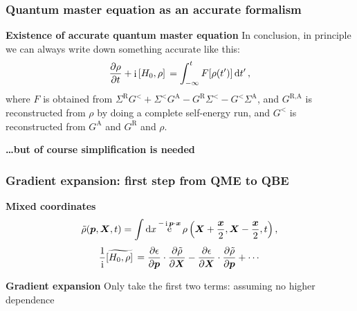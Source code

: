 \documentclass[t]{beamer}
\DeclareMathOperator{\ee}{e}
\DeclareMathOperator{\ii}{i}
\begin{document}
\begin{frame}
\frametitle{Quantum master equation as an accurate formalism}

\textbf{Existence of accurate quantum master equation} 
In conclusion, in principle we can always write down something accurate like this:
\begin{equation}
    \pdv{\rho}{t} + \ii \comm*{H_0}{\rho} = \int_{-\infty}^{t} F[\rho(t')] \dd{t'},
\end{equation}
where $F$ is obtained from $\Sigma^{\text{R}} G^< + \Sigma^< G^{\text{A}} - G^{\text{R}} \Sigma^< - G^< \Sigma^{\text{A}}$,
and $G^{\text{R}, \text{A}}$ is reconstructed from $\rho$ 
by doing a complete self-energy run,
and $G^<$ is reconstructed from $G^\text{A}$ and $G^{\text{R}}$ and $\rho$.

\vspace{0.25pt}

\textbf{\dots but of course simplification is needed} 

\end{frame}

\begin{frame}
\frametitle{Gradient expansion: first step from QME to QBE}

\textbf{Mixed coordinates}
\begin{equation}
    \tilde{\rho}(\vb*{p}, \vb*{X}, t) = \int \dd{x} 
    \ee^{- \ii \vb*{p} \cdot \vb*{x}} \rho\left(
        \vb*{X} + \frac{\vb*{x}}{2}, \vb*{X} - \frac{\vb*{x}}{2}, t
    \right),
\end{equation}    
\begin{equation}
    \frac{1}{\ii} \widetilde{\comm*{H_0}{\rho}} = 
    \pdv{\epsilon}{\vb*{p}} \cdot \pdv{\tilde{\rho}}{\vb*{X}}
    - \pdv{\epsilon}{\vb*{X}} \cdot \pdv{\tilde{\rho}}{\vb*{p}} + \cdots
\end{equation}

\vspace{0.25cm}

\textbf{Gradient expansion} Only take the first two terms:
assuming no higher dependence

\end{frame}
\end{document}
